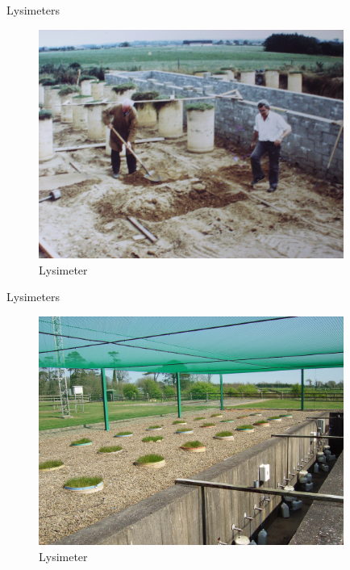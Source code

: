 \documentclass[17pt,aspectratio=169]{beamer}
\begin{document}
\begin{frame}[label={sec:org55a628a}]{Lysimeters}
\begin{figure}[htbp]
\centering
\includegraphics[width=10cm]{./lys_photos/IMGP0225.JPG}
\caption{\label{fig:orgc405371}
Lysimeter}
\end{figure}
\end{frame}

\begin{frame}[label={sec:org6eb7162}]{Lysimeters}
\begin{figure}[htbp]
\centering
\includegraphics[width=10cm]{./lys_photos/IMGP0305.JPG}
\caption{\label{fig:org20befe1}
Lysimeter}
\end{figure}
\end{frame}
\end{document}
